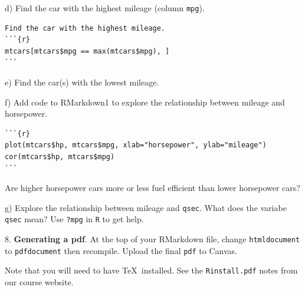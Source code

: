 \documentclass[10pt]{article}
\newcommand{\U}{\underline{\hspace{5pt}}}
\begin{document}
\hspace{10pt} d) Find the car with the highest
mileage (column \texttt{mpg}).\vspace{-10pt}
\begin{verbatim}
Find the car with the highest mileage.
```{r}
mtcars[mtcars$mpg == max(mtcars$mpg), ]
```
\end{verbatim}

\hspace{10pt} e) Find the car(s) with the lowest mileage.
\medskip

\hspace{10pt} f) Add code to RMarkdown1 to explore the relationship between
mileage and horsepower.\vspace{-10pt}
\begin{verbatim}
```{r}
plot(mtcars$hp, mtcars$mpg, xlab="horsepower", ylab="mileage")
cor(mtcars$hp, mtcars$mpg)
```
\end{verbatim}
Are higher horsepower cars more or less fuel efficient than lower horsepower cars?

\hspace{10pt} g) Explore the relationship between mileage and \texttt{qsec}.
What does the variabe \texttt{qsec} mean?  Use \texttt{?mpg} in \texttt{R}
to get help.
\medskip
\bigskip


8. \textbf{Generating a pdf}. At the top of your RMarkdown file, change
\texttt{html\U document} to \texttt{pdf\U document} then recompile.
Upload the final \texttt{pdf} to Canvas.

Note that you will need to have \TeX\ installed.  
See the \texttt{R\U install.pdf} notes from our course website.
\vfill
\eject
\end{document}
